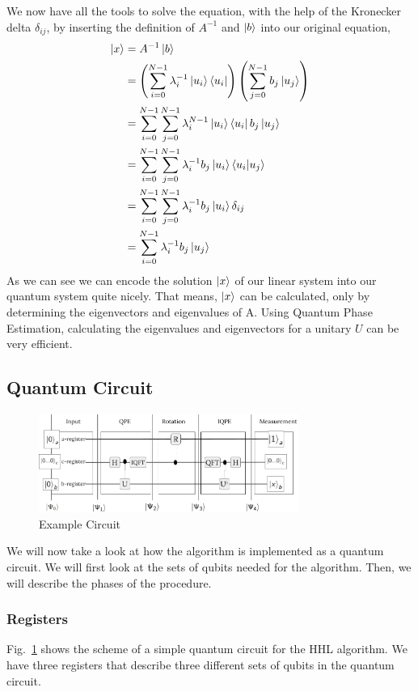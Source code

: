 We now have all the tools to solve the equation, with the help of the Kronecker delta $\delta_{ij}$, by inserting the definition of $A^{-1}$ and $\ket b$ into our original equation,
\begin{equation}
\begin{split}
\ket{x} &= A^{-1} \ket{b}\\
&=\left(\sum_{i=0}^{N-1} \lambda_i^{-1} \ket{u_i}\bra{u_i} \right) \left(\sum_{j=0}^{N-1} b_j\ket{u_j} \right) \\
&=\sum_{i=0}^{N-1} \sum_{j=0}^{N-1} \lambda_i^{N-1} \ket{u_i}\bra{u_i} b_j\ket{u_j}\\
&=\sum_{i=0}^{N-1} \sum_{j=0}^{N-1} \lambda_i^{-1} b_j\ket{u_i}\braket{u_i| u_j}\\
&=\sum_{i=0}^{N-1} \sum_{j=0}^{N-1} \lambda_i^{-1} b_j\ket{u_i}\delta_{ij}\\
&=\sum_{i=0}^{N-1} \lambda_i^{-1} b_j\ket{u_j}\\
\end{split}
\end{equation}
As we can see we can encode the solution $\ket x$ of our linear system into our quantum system quite nicely.
That means, $\ket x$ can be calculated, only by determining the eigenvectors and eigenvalues of A. 
Using Quantum Phase Estimation, calculating the eigenvalues and eigenvectors for a unitary $U$ can be very efficient.



\subsection{Quantum Circuit}

\begin{figure}
    \centering
    \includegraphics[width=8.5cm]{img/example_circuit_cropped.png}
    \caption{Example Circuit}
    \label{ex_circ}
\end{figure}


We will now take a look at how the algorithm is implemented as a quantum circuit. 
We will first look at the sets of qubits needed for the algorithm. 
Then, we will describe the phases of the procedure.

\subsubsection{Registers}
Fig.~\ref{ex_circ} shows the scheme of a simple quantum circuit for the HHL algorithm.
We have three registers that describe three different sets of qubits in the quantum circuit.

